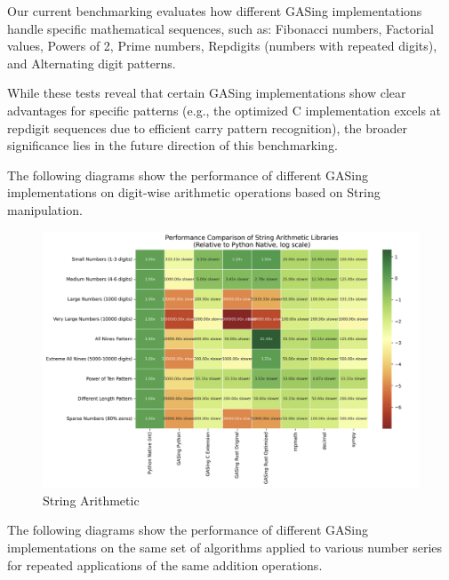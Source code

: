 Our current benchmarking evaluates how different GASing implementations handle specific mathematical sequences, such as: Fibonacci numbers, Factorial values, Powers of 2, Prime numbers, Repdigits (numbers with repeated digits), and Alternating digit patterns.

While these tests reveal that certain GASing implementations show clear advantages for specific patterns (e.g., the optimized C implementation excels at repdigit sequences due to efficient carry pattern recognition), the broader significance lies in the future direction of this benchmarking.

The following diagrams show the performance of different GASing implementations on digit-wise arithmetic operations based on String manipulation.

\begin{figure}[H]
  \centering
  \includegraphics[width=\linewidth]{images/StringArithmetic.png}
  \caption{String Arithmetic}
  \label{fig:stringarithmetic}
\end{figure}



The following diagrams show the performance of different GASing implementations on the same set of algorithms applied to various number series for repeated applications of the same addition operations.

